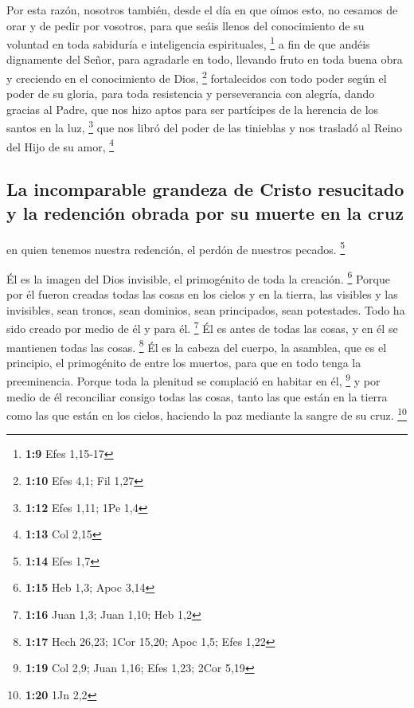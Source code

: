  Por esta razón, nosotros también, desde el día en que
oímos esto, no cesamos de orar y de pedir por vosotros, para que seáis
llenos del conocimiento de su voluntad en toda sabiduría e inteligencia
espirituales, \footnote{\textbf{1:9} Efes 1,15-17}  a fin
de que andéis dignamente del Señor, para agradarle en todo, llevando
fruto en toda buena obra y creciendo en el conocimiento de Dios,
\footnote{\textbf{1:10} Efes 4,1; Fil 1,27}  fortalecidos
con todo poder según el poder de su gloria, para toda resistencia y
perseverancia con alegría,  dando gracias al Padre, que
nos hizo aptos para ser partícipes de la herencia de los santos en la
luz, \footnote{\textbf{1:12} Efes 1,11; 1Pe 1,4}  que nos
libró del poder de las tinieblas y nos trasladó al Reino del Hijo de su
amor, \footnote{\textbf{1:13} Col 2,15}

\hypertarget{la-incomparable-grandeza-de-cristo-resucitado-y-la-redenciuxf3n-obrada-por-su-muerte-en-la-cruz}{%
\subsection{La incomparable grandeza de Cristo resucitado y la redención
obrada por su muerte en la
cruz}\label{la-incomparable-grandeza-de-cristo-resucitado-y-la-redenciuxf3n-obrada-por-su-muerte-en-la-cruz}}

 en quien tenemos nuestra redención, el perdón de
nuestros pecados. \footnote{\textbf{1:14} Efes 1,7}

 Él es la imagen del Dios invisible, el primogénito de
toda la creación. \footnote{\textbf{1:15} Heb 1,3; Apoc 3,14}
 Porque por él fueron creadas todas las cosas en los
cielos y en la tierra, las visibles y las invisibles, sean tronos, sean
dominios, sean principados, sean potestades. Todo ha sido creado por
medio de él y para él. \footnote{\textbf{1:16} Juan 1,3; Juan 1,10; Heb
  1,2}  Él es antes de todas las cosas, y en él se
mantienen todas las cosas. \footnote{\textbf{1:17} Hech 26,23; 1Cor
  15,20; Apoc 1,5; Efes 1,22}  Él es la cabeza del
cuerpo, la asamblea, que es el principio, el primogénito de entre los
muertos, para que en todo tenga la preeminencia.  Porque
toda la plenitud se complació en habitar en él, \footnote{\textbf{1:19}
  Col 2,9; Juan 1,16; Efes 1,23; 2Cor 5,19}  y por medio
de él reconciliar consigo todas las cosas, tanto las que están en la
tierra como las que están en los cielos, haciendo la paz mediante la
sangre de su cruz. \footnote{\textbf{1:20} 1Jn 2,2}

